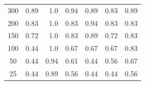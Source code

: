 \begin{table}[htp!]
\begin{tabular}{crrrrrr}
300                                                                  & 0.89                                                                             & 1.0                                                                            & 0.94                                                                             & 0.89   & 0.83 & 0.89                                                                         \\
200                                                                  & 0.83                                                                             & 1.0                                                                            & 0.83                                                                             & 0.94  & 0.83 &  0.83                                                                         \\
150                                                                  & 0.72                                                                             & 1.0                                                                            & 0.83                                                                             & 0.89    & 0.72 &  0.83                                                                      \\
100                                                                  & 0.44                                                                             & 1.0                                                                            & 0.67                                                                             & 0.67  & 0.67 & 0.83                                                                          \\
50                                                                   & 0.44                                                                             & 0.94                                                                           & 0.61                                                                             & 0.44   & 0.56 & 0.67                                                                         \\
25                                                                   & 0.44                                                                             & 0.89                                                                           & 0.56                                                                             & 0.44 & 0.44 & 0.56   \\ \bottomrule                                                                        

\end{tabular}
\end{table}
